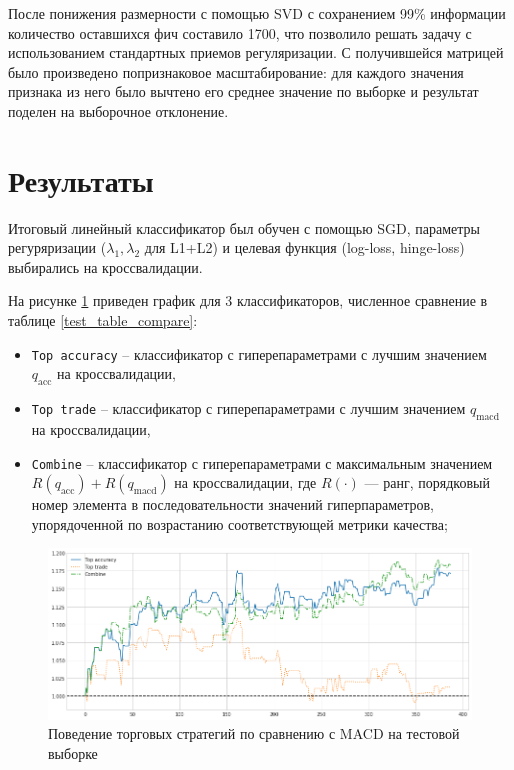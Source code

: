 \documentclass[pdftex,14pt,a4paper]{extreport}
\begin{document}
После понижения размерности с помощью SVD\cite{svd} с сохранением
99\% информации количество оставшихся фич составило 1700, что позволило решать задачу с использованием стандартных
приемов регуляризации. С получившейся матрицей было произведено попризнаковое
масштабирование: для каждого значения признака из него было вычтено его среднее значение по выборке и результат поделен на
выборочное отклонение.

\section{Результаты}

Итоговый линейный классификатор был обучен с помощью SGD\cite{sgd}, параметры регуряризации ($\lambda_1,\lambda_2$ для L1+L2)
и целевая функция (log-loss, hinge-loss) выбирались на кроссвалидации.

На рисунке \ref{fig:vs_macd_on_test} приведен график для 3 классификаторов, численное сравнение в таблице \ref{test_table_compare}:

\begin{itemize}
\item \texttt{Top accuracy} -- классификатор с гиперепараметрами с лучшим значением $q_\text{acc}$ на кроссвалидации,
\item \texttt{Top trade} -- классификатор с гиперепараметрами с лучшим значением $q_\text{macd}$ на кроссвалидации,
\item \texttt{Combine} -- классификатор с гиперепараметрами с максимальным значением $R(q_\text{acc}) + R(q_\text{macd})$ на кроссвалидации,
где $R(\cdot)$ --- ранг, порядковый номер элемента в последовательности значений гиперпараметров, упорядоченной по возрастанию
соответствующей метрики качества;
\end{itemize}

\begin{figure}[h]
\includegraphics[width=\linewidth]{vs_macd_on_test}
\caption{Поведение торговых стратегий по сравнению с MACD на тестовой выборке \label{fig:vs_macd_on_test}}
\end{figure}
\end{document}
